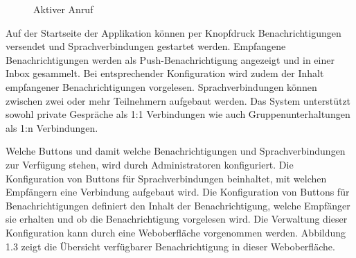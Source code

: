 \begin{figure}[h]
\begin{minipage}[b]{0.4\textwidth}
        \caption{Aktiver Anruf}
    \end{minipage}
    \label{fig:MobileClient-ScreensIntroduction}
\end{figure}

Auf der Startseite der Applikation können per Knopfdruck Benachrichtigungen versendet und Sprachverbindungen gestartet werden.
Empfangene Benachrichtigungen werden als Push-Benachrichtigung angezeigt und in einer Inbox gesammelt.
Bei entsprechender Konfiguration wird zudem der Inhalt empfangener Benachrichtigungen vorgelesen.
Sprachverbindungen können zwischen zwei oder mehr Teilnehmern aufgebaut werden.
Das System unterstützt sowohl private Gespräche als 1:1 Verbindungen wie auch Gruppenunterhaltungen als 1:n Verbindungen.

Welche Buttons und damit welche Benachrichtigungen und Sprachverbindungen zur Verfügung stehen, wird durch Administratoren konfiguriert.
Die Konfiguration von Buttons für Sprachverbindungen beinhaltet, mit welchen Empfängern eine Verbindung aufgebaut wird.
Die Konfiguration von Buttons für Benachrichtigungen definiert den Inhalt der Benachrichtigung, welche Empfänger sie erhalten und ob die Benachrichtigung vorgelesen wird.
Die Verwaltung dieser Konfiguration kann durch eine Weboberfläche vorgenommen werden.
Abbildung 1.3 zeigt die Übersicht verfügbarer Benachrichtigung in dieser Weboberfläche.

